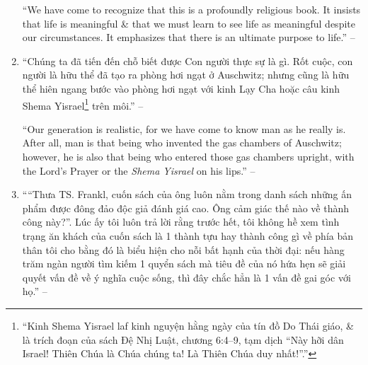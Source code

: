 \documentclass[oneside]{book}
\numberwithin{equation}{section}
\begin{document}
\begin{enumerate}[leftmargin=0mm]
	``We have come to recognize that this is a profoundly religious book. It insists that life is meaningful \& that we must learn to see life as meaningful despite our circumstances. It emphasizes that there is an ultimate purpose to life.'' -- \cite[Preface by \textsc{Harold S. Kushner}, p. 10]{Frankl2013}
	\item ``Chúng ta đã tiến đến chỗ biết được Con người thực sự là gì. Rốt cuộc, con người là hữu thể đã tạo ra phòng hơi ngạt ở Auschwitz; nhưng cũng là hữu thể hiên ngang bước vào phòng hơi ngạt với kinh Lạy Cha hoặc câu kinh Shema Yisrael\footnote{``Kinh Shema Yisrael laf kinh nguyện hằng ngày của tín đồ Do Thái giáo, \& là trích đoạn của sách Đệ Nhị Luật, chương 6:4--9, tạm dịch ``Này hỡi dân Israel! Thiên Chúa là Chúa chúng ta! Là Thiên Chúa duy nhất!''.''} trên môi.'' -- \cite[p. 9]{Frankl2022}
	
	``Our generation is realistic, for we have come to know man as he really is. After all, man is that being who invented the gas chambers of Auschwitz; however, he is also that being who entered those gas chambers upright, with the Lord's Prayer or the \textit{Shema Yisrael} on his lips.'' -- \cite[p. 10]{Frankl2013}
	\item ````Thưa TS. Frankl, cuốn sách của ông luôn nằm trong danh sách những ấn phẩm được đông đảo độc giả đánh giá cao. Ông cảm giác thế nào về thành công này?''. Lúc ấy tôi luôn trả lời rằng trước hết, tôi không hề xem tình trạng ăn khách của cuốn sách là 1 thành tựu hay thành công gì về phía bản thân tôi cho bằng đó là biểu hiện cho nỗi bất hạnh của thời đại: nếu hàng trăm ngàn người tìm kiếm 1 quyển sách mà tiêu đề của nó hứa hẹn sẽ giải quyết vấn đề về ý nghĩa cuộc sống, thì đây chắc hẳn là 1 vấn đề gai góc với họ.'' -- \cite[pp. 11--12]{Frankl2022}
	

\end{enumerate}
\end{document}
